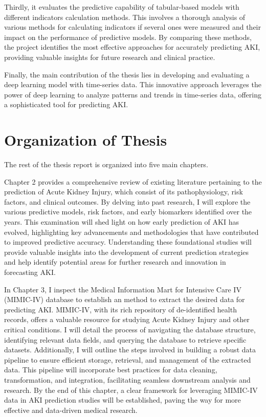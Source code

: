 \documentclass[../main.tex]{subfiles}
\begin{document}
Thirdly, it evaluates the predictive capability of tabular-based models with different indicators calculation methods. 
This involves a thorough analysis of various methods for calculating indicators if several ones were measured and their impact on the performance of predictive models. 
By comparing these methods, the project identifies the most effective approaches for accurately predicting AKI, providing valuable insights for future research and clinical practice.

Finally, the main contribution of the thesis lies in developing and evaluating a deep learning model with time-series data.
This innovative approach leverages the power of deep learning to analyze patterns and trends in time-series data, offering a sophisticated tool for predicting AKI.

\section{Organization of Thesis}
The rest of the thesis report is organized into five main chapters.

Chapter 2 provides a comprehensive review of existing literature pertaining to the prediction of Acute Kidney Injury,  which consist of its pathophysiology, risk factors, and clinical outcomes.
By delving into past research, I will explore the various predictive models, risk factors, and early biomarkers identified over the years.
This examination will shed light on how early prediction of AKI has evolved, highlighting key advancements and methodologies that have contributed to improved predictive accuracy.
Understanding these foundational studies will provide valuable insights into the development of current prediction strategies and help identify potential areas for further research and innovation in forecasting AKI.

In Chapter 3, I inspect the Medical Information Mart for Intensive Care IV (MIMIC-IV) database to establish an method to extract the desired data for predicting AKI. 
MIMIC-IV, with its rich repository of de-identified health records, offers a valuable resource for studying Acute Kidney Injury and other critical conditions. 
I will detail the process of navigating the database structure, identifying relevant data fields, and querying the database to retrieve specific datasets. 
Additionally, I will outline the steps involved in building a robust data pipeline to ensure efficient storage, retrieval, and management of the extracted data. 
This pipeline will incorporate best practices for data cleaning, transformation, and integration, facilitating seamless downstream analysis and research. 
By the end of this chapter, a clear framework for leveraging MIMIC-IV data in AKI prediction studies will be established, paving the way for more effective and data-driven medical research.
\end{document}
